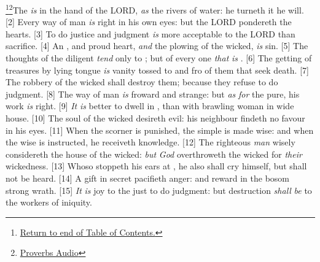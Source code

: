 \footnote{\textcolor[cmyk]{0.99998,1,0,0}{\hyperlink{TOC}{Return to end of Table of Contents.}}}\footnote{\href{https://www.audioverse.org/english/audiobibles/books/ENGKJV/O/Prov/1}{\textcolor[cmyk]{0.99998,1,0,0}{Proverbs Audio}}}\textcolor[cmyk]{0.99998,1,0,0}{The  \emph{is} in the hand of the LORD, \emph{as} the rivers of water: he turneth it  he will.}
[2] \textcolor[cmyk]{0.99998,1,0,0}{Every way of   man \emph{is} right in his own eyes: but the LORD pondereth the hearts.}
[3] \textcolor[cmyk]{0.99998,1,0,0}{To do justice and judgment \emph{is} more acceptable to the LORD than sacrifice.}
[4] \textcolor[cmyk]{0.99998,1,0,0}{An , and   proud heart, \emph{and} the plowing of the wicked, \emph{is} sin.}
[5] \textcolor[cmyk]{0.99998,1,0,0}{The thoughts of the diligent \emph{tend} only to ; but of every one \emph{that} \emph{is} .}
[6] \textcolor[cmyk]{0.99998,1,0,0}{The getting of treasures by   lying tongue \emph{is}   vanity tossed to and fro of them that seek death.}
[7] \textcolor[cmyk]{0.99998,1,0,0}{The robbery of the wicked shall destroy them; because they refuse to do judgment.}
[8] \textcolor[cmyk]{0.99998,1,0,0}{The way of man \emph{is} froward and strange: but \emph{as} \emph{for} the pure, his work \emph{is} right.}
[9] \textcolor[cmyk]{0.99998,1,0,0}{\emph{It} \emph{is} better to dwell in   , than with   brawling woman in  wide house.}
[10] \textcolor[cmyk]{0.99998,1,0,0}{The soul of the wicked desireth evil: his neighbour findeth no favour in his eyes.}
[11] \textcolor[cmyk]{0.99998,1,0,0}{When the scorner is punished, the simple is made wise: and when the wise is instructed, he receiveth knowledge.}
[12] \textcolor[cmyk]{0.99998,1,0,0}{The righteous \emph{man} wisely considereth the house of the wicked: \emph{but} \emph{God} overthroweth the wicked for \emph{their} wickedness.}
[13] \textcolor[cmyk]{0.99998,1,0,0}{Whoso stoppeth his ears at , he also shall cry himself, but shall not be heard.}
[14] \textcolor[cmyk]{0.99998,1,0,0}{A gift in secret pacifieth anger: and  reward in the bosom strong wrath.}
[15] \textcolor[cmyk]{0.99998,1,0,0}{\emph{It} \emph{is} joy to the just to do judgment: but destruction \emph{shall} \emph{be} to the workers of iniquity.}
